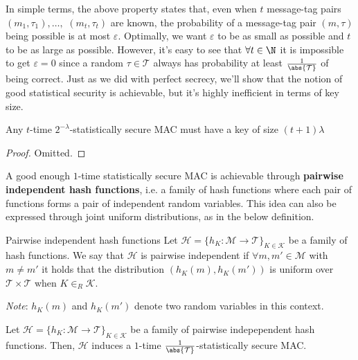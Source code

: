 \documentclass[a4paper, 12pt]{report}
\begin{document}
    In simple terms, the above property states that, even when $t$ message-tag pairs $(m_1, \tau_1), \ldots,$ $(m_t, \tau_t)$ are known, the probability of a message-tag pair $(m,\tau)$ being possible is at most $\varepsilon$. Optimally, we want $\varepsilon$ to be as small as possible and $t$ to be as large as possible. However, it's easy to see that $\forall t \in \N$ it is impossible to get $\varepsilon = 0$ since a random $\tau \in \mathcal{T}$ always has probability at least $\frac{1}{\abs{\mathcal{T}}}$ of being correct. Just as we did with perfect secrecy, we'll show that the notion of good statistical security is achievable, but it's highly inefficient in terms of key size. 

    \begin{framedthm}{}
        Any $t$-time $2^{-\lambda}$-statistically secure MAC must have a key of size $(t+1)\lambda$
    \end{framedthm}

    \begin{proof}
        Omitted.
    \end{proof}

    A good enough $1$-time statistically secure MAC is achievable through \textbf{pairwise independent hash functions}, i.e. a family of hash functions where each pair of functions forms a pair of independent random variables. This idea can also be expressed through joint uniform distributions, as in the below definition.

    \begin{frameddefn}{Pairwise independent hash functions}
        Let $\mathcal{H} = \{h_K : \mathcal{M} \to \mathcal{T}\}_{K \in \mathcal{K}}$ be a family of hash functions. We say that $\mathcal{H}$ is pairwise independent if $\forall m, m' \in \mathcal{M}$ with $m \neq m'$ it holds that the distribution $(h_K(m), h_K(m'))$ is uniform over $\mathcal{T} \times \mathcal{T}$ when $K \in_R \mathcal{K}$.

        \textit{Note}: $h_K(m)$ and $h_K(m')$ denote two random variables in this context.
    \end{frameddefn}

    \begin{framedthm}{}
        Let $\mathcal{H} = \{h_K : \mathcal{M} \to \mathcal{T}\}_{K \in \mathcal{K}}$ be a family of pairwise indepependent hash functions. Then, $\mathcal{H}$ induces a $1$-time $\frac{1}{\abs{\mathcal{T}}}$-statistically secure MAC.
    \end{framedthm}
\end{document}
